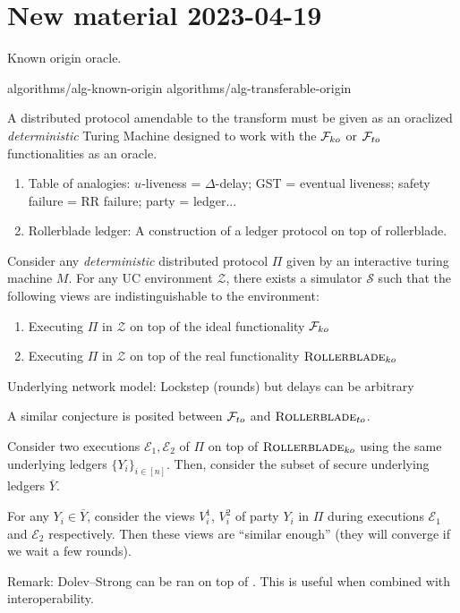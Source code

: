 \section{New material 2023-04-19}

Known origin oracle.

{algorithms/alg-known-origin}
{algorithms/alg-transferable-origin}


A distributed protocol amendable to the \rollerblade transform must be given as
an oraclized \emph{deterministic} Turing Machine designed to work with the
$\mathcal{F}_{ko}$ or $\mathcal{F}_{to}$ functionalities as an oracle.

\begin{enumerate}
  \item Table of analogies: $u$-liveness = $\Delta$-delay; GST = eventual liveness; safety failure = RR failure; party = ledger...
  \item Rollerblade ledger: A construction of a ledger protocol on top of rollerblade.
\end{enumerate}

\begin{conjecture}[A]
  Consider any \emph{deterministic} distributed protocol $\Pi$ given by an interactive turing machine $M$.
  For any UC environment $\mathcal{Z}$, there exists a simulator $\mathcal{S}$ such that the following
  views are indistinguishable to the environment:
  \begin{enumerate}
    \item Executing $\Pi$ in $\mathcal{Z}$ on top of the ideal functionality $\mathcal{F}_{ko}$
    \item Executing $\Pi$ in $\mathcal{Z}$ on top of the real functionality $\textsc{Rollerblade}_{ko}$
  \end{enumerate}
\end{conjecture}


Underlying network model: Lockstep (rounds) but delays can be arbitrary

A similar conjecture is posited between $\mathcal{F}_{to}$ and $\textsc{Rollerblade}_{to}$.

\begin{conjecture}[B]
  Consider two executions $\mathcal{E}_1, \mathcal{E}_2$
  of $\Pi$ on top of $\textsc{Rollerblade}_{ko}$ using the same underlying ledgers
  $\{Y_i\}_{i\in[n]}$. Then, consider the subset of secure underlying ledgers
  $\overline{Y}$.

  For any $Y_i \in \overline{Y}$, consider the views $V^1_i$, $V^2_i$
  of party $Y_i$ in $\Pi$ during executions $\mathcal{E}_1$ and $\mathcal{E}_2$
  respectively. Then these views are ``similar enough'' (they will converge
  if we wait a few rounds).
\end{conjecture}

Remark: Dolev--Strong can be ran on top of \rollerblade. This is useful when combined with interoperability.
